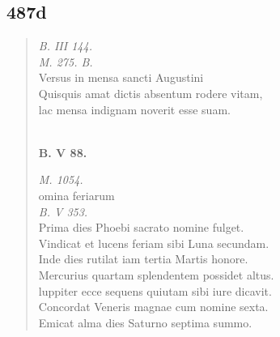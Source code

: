 \documentclass[11pt, a4paper]{report}
\begin{document}
            \subsection*{487d}
      \begin{verse}
      \textit{B. III 144.} \\ \textit{M. 275. B.} \\ Versus in mensa sancti Augustini \\ Quisquis amat dictis absentum rodere vitam, \\ lac mensa indignam noverit esse suam. \\ 
        ﻿\pagebreak 
        ﻿\pagebreak 
     \marginpar{[488]} \begin{center} \textbf{B. V 88.} \end{center}\textit{M. 1054.} \\ omina feriarum \\ \textit{B. V 353.} \\ Prima dies Phoebi sacrato nomine fulget. \\ Vindicat et lucens feriam sibi Luna secundam. \\ Inde dies rutilat iam tertia Martis honore. \\ Mercurius quartam splendentem possidet altus. \\ luppiter ecce sequens quiutam sibi iure dicavit. \\ Concordat Veneris magnae cum nomine sexta. \\ Emicat alma dies Saturno septima summo. \\ 
      \end{verse}
  
\end{document}
